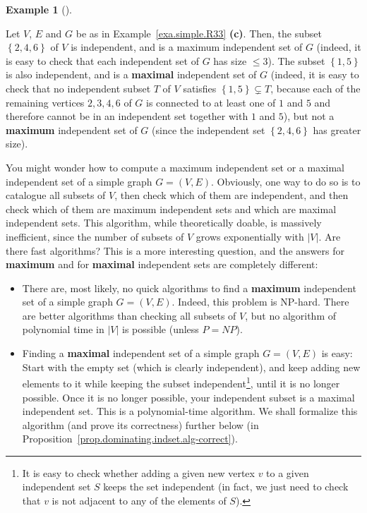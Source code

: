 \documentclass[numbers=enddot,12pt,final,onecolumn,notitlepage]{scrartcl}%
\theoremstyle{definition}
\newtheorem{exam}[theo]{Example}
\newenvironment{example}[1][]
{\begin{exam}[#1]\begin{leftbar}}
{\end{leftbar}\end{exam}}
\newcommand{\set}[1]{\left\{ #1 \right\}}
\newcommand{\abs}[1]{\left| #1 \right|}
\newcommand{\tup}[1]{\left( #1 \right)}
\begin{document}
\begin{example}
Let $V$, $E$ and $G$ be as in Example~\ref{exa.simple.R33}
\textbf{(c)}. Then, the subset $\set{2, 4, 6}$ of $V$ is
independent, and is a maximum independent set of $G$
(indeed, it is easy to check that each independent set of $G$
has size $\leq 3$). The subset $\set{1, 5}$ is also
independent, and is a \textbf{maximal} independent set of $G$
(indeed, it is easy to check that no independent subset $T$
of $V$ satisfies $\set{1, 5} \subsetneq T$, because each of
the remaining vertices $2, 3, 4, 6$ of $G$ is connected to
at least one of $1$ and $5$ and therefore cannot be in an
independent set together with $1$ and $5$), but not a
\textbf{maximum} independent set of $G$ (since the independent
set $\set{2, 4, 6}$ has greater size).
\end{example}

You might wonder how to compute a maximum independent set
or a maximal independent set of a simple graph $G = \tup{V, E}$.
Obviously, one way to do so is to catalogue all subsets of $V$,
then check which of them are independent, and then check which
of them are maximum independent sets and which are maximal
independent sets. This algorithm, while theoretically doable,
is massively inefficient, since the number of subsets of $V$
grows exponentially with $\abs{V}$. Are there fast algorithms?
This is a more interesting question, and the answers for
\textbf{maximum} and for \textbf{maximal} independent sets
are completely different:
\begin{itemize}
 \item There are, most likely, no quick algorithms to find
       a \textbf{maximum} independent set of a simple graph
       $G = \tup{V, E}$. Indeed, this problem is NP-hard. There
       are better algorithms than checking all subsets of $V$,
       but no algorithm of polynomial time in $\abs{V}$ is
       possible (unless $P = NP$).
 \item Finding a \textbf{maximal} independent set of a simple
       graph $G = \tup{V, E}$ is easy: Start with the empty
       set (which is clearly independent), and keep adding new
       elements to it while keeping the subset
       independent\footnote{It is easy to check whether
       adding a given new vertex
       $v$ to a given independent set $S$ keeps the set
       independent (in fact, we just need to check that $v$
       is not adjacent to any of the elements of $S$).},
       until it is no longer possible.
       Once it is no longer possible, your independent subset
       is a maximal independent set. This is a polynomial-time
       algorithm. We shall formalize this algorithm (and prove its
       correctness) further below (in
       Proposition~\ref{prop.dominating.indset.alg-correct}).
\end{itemize}
\end{document}
